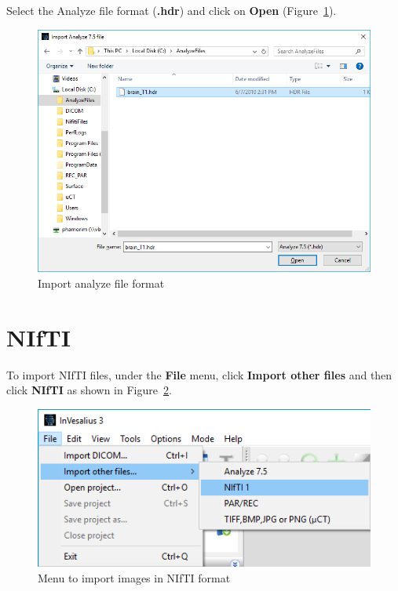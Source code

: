 Select the Analyze file format (\textbf{.hdr}) and click on \textbf{Open} (Figure~\ref{fig:analyze_import}).
 
\begin{figure}[!htb]
\centering
\includegraphics[scale=0.4]{../user_guide_figures/invesalius_screen/import_analyze_window_en.png}
\caption{Import analyze file format}
\label{fig:analyze_import}
\end{figure}

\section{NIfTI}

To import NIfTI files, under the \textbf{File}  menu, click \textbf{Import other files} and then click \textbf{NIfTI} as shown in Figure~\ref{fig:import_nifti_menu_pt}.


\begin{figure}[!htb]
\centering
\includegraphics[scale=0.4]{../user_guide_figures/invesalius_screen/import_nifti_menu_en.png}
\caption{Menu to import images in NIfTI format}
\label{fig:import_nifti_menu_pt}
\end{figure}

